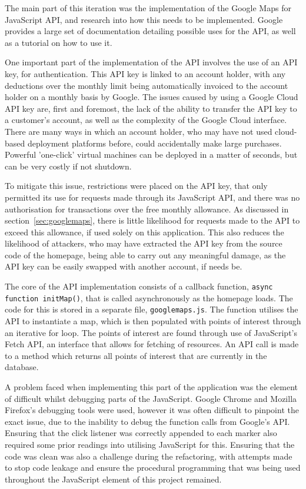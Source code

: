 The main part of this iteration was the implementation of the Google Maps for JavaScript API, and research into how this needs to be implemented. Google provides a large set of documentation detailing possible uses for the API, as well as a tutorial on how to use it.

One important part of the implementation of the API involves the use of an API key, for authentication. This API key is linked to an account holder, with any deductions over the monthly limit being automatically invoiced to the account holder on a monthly basis by Google. The issues caused by using a Google Cloud API key are, first and foremost, the lack of the ability to transfer the API key to a customer's account, as well as the complexity of the Google Cloud interface. There are many ways in which an account holder, who may have not used cloud-based deployment platforms before, could accidentally make large purchases. Powerful 'one-click' virtual machines can be deployed in a matter of seconds, but can be very costly if not shutdown.

To mitigate this issue, restrictions were placed on the API key, that only permitted its use for requests made through its JavaScript API, and there was no authorisation for transactions over the free monthly allowance. As discussed in section~\ref{sec:googlemaps}, there is little likelihood for requests made to the API to exceed this allowance, if used solely on this application. This also reduces the likelihood of attackers, who may have extracted the API key from the source code of the homepage, being able to carry out any meaningful damage, as the API key can be easily swapped with another account, if needs be.

The core of the API implementation consists of a callback function, \texttt{async function initMap()}, that is called asynchronously as the homepage loads. The code for this is stored in a separate file, \texttt{googlemaps.js}. The function utilises the API to instantiate a map, which is then populated with points of interest through an iterative for loop. The points of interest are found through use of JavaScript's Fetch API, an interface that allows for fetching of resources. An API call is made to a method which returns all points of interest that are currently in the database.

A problem faced when implementing this part of the application was the element of difficult whilst debugging parts of the JavaScript. Google Chrome and Mozilla Firefox's debugging tools were used, however it was often difficult to pinpoint the exact issue, due to the inability to debug the function calls from Google's API. Ensuring that the click listener was correctly appended to each marker also required some prior readings into utilising JavaScript for this. Ensuring that the code was clean was also a challenge during the refactoring, with attempts made to stop code leakage and ensure the procedural programming that was being used throughout the JavaScript element of this project remained.

